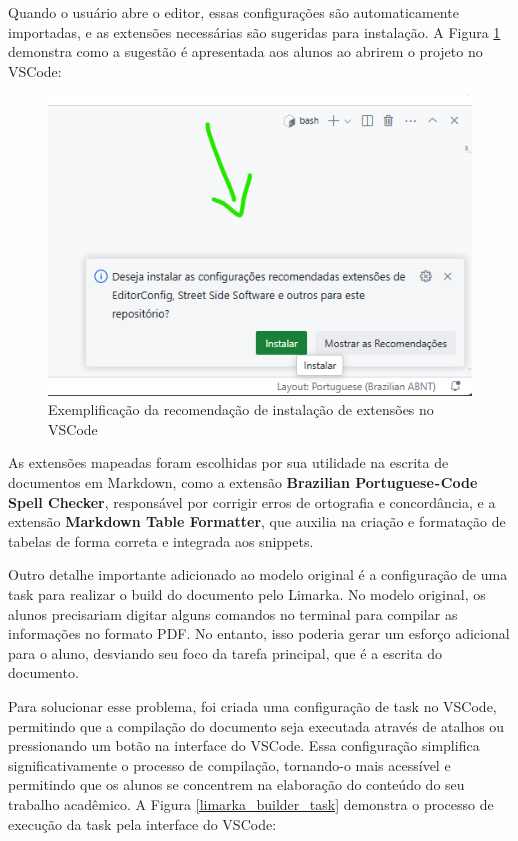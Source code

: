 \documentclass[
	12pt,				%
	oneside,			%
	a4paper,			%
	english,			%
	french,				%
	spanish,			%
	brazil				%
	]{abntex2}
\begin{document}
Quando o usuário abre o editor, essas configurações são automaticamente
importadas, e as extensões necessárias são sugeridas para instalação. A
Figura \ref{extensoes_mapeadas_vscode} demonstra como a sugestão é
apresentada aos alunos ao abrirem o projeto no VSCode:

\begin{figure}[htbp]
\hypertarget{extensoes_mapeadas_vscode}{%
\caption{Exemplificação da recomendação de instalação de extensões no VSCode}\label{extensoes_mapeadas_vscode}
\begin{center}
\includegraphics[scale=0.6]{imagens/screenshot/extensoes-mapeadas-vscode.png}
\end{center}
}
\end{figure}

As extensões mapeadas foram escolhidas por sua utilidade na escrita de
documentos em Markdown, como a extensão \textbf{Brazilian
Portuguese - Code Spell Checker}, responsável por corrigir erros de
ortografia e concordância, e a extensão \textbf{Markdown Table
Formatter}, que auxilia na criação e formatação de tabelas de forma
correta e integrada aos snippets.

Outro detalhe importante adicionado ao modelo original é a configuração
de uma task para realizar o build do documento pelo Limarka. No modelo
original, os alunos precisariam digitar alguns comandos no terminal para
compilar as informações no formato PDF. No entanto, isso poderia gerar
um esforço adicional para o aluno, desviando seu foco da tarefa
principal, que é a escrita do documento.

Para solucionar esse problema, foi criada uma configuração de task no
VSCode, permitindo que a compilação do documento seja executada através
de atalhos ou pressionando um botão na interface do VSCode. Essa
configuração simplifica significativamente o processo de compilação,
tornando-o mais acessível e permitindo que os alunos se concentrem na
elaboração do conteúdo do seu trabalho acadêmico. A Figura
\ref{limarka_builder_task} demonstra o processo de execução da task pela
interface do VSCode:
\end{document}
